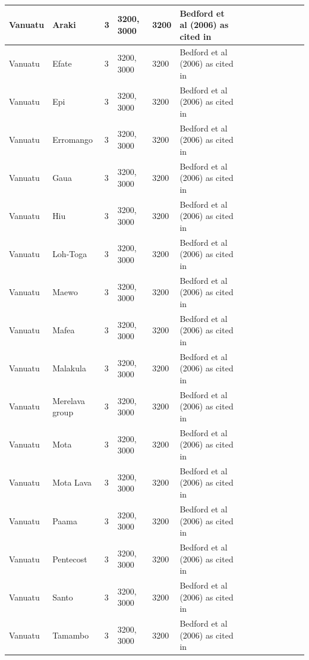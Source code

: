 \documentclass[draft,10pt]{article} %
\begin{document}
\begin{landscape}
\begin{longtable}{| p{3cm}| p{4cm}| p{4cm}|p{2cm}|p{2cm}|p{2cm}|p{2cm}|p{2cm}|p{2cm}|p{2cm}|p{2cm}|p{2cm}|p{2cm}|p{2cm}}
 Vanuatu & Araki & 3 & 3200, 3000 & 3200 & Bedford et al (2006) as cited in \citet{rieth_cochrane_2018} &   \\ \hline
 Vanuatu & Efate & 3 & 3200, 3000 & 3200 & Bedford et al (2006) as cited in \citet{rieth_cochrane_2018} &   \\ \hline
 Vanuatu & Epi & 3 & 3200, 3000 & 3200 & Bedford et al (2006) as cited in \citet{rieth_cochrane_2018} &   \\ \hline
 Vanuatu & Erromango & 3 & 3200, 3000 & 3200 & Bedford et al (2006) as cited in \citet{rieth_cochrane_2018} &   \\ \hline
 Vanuatu & Gaua & 3 & 3200, 3000 & 3200 & Bedford et al (2006) as cited in \citet{rieth_cochrane_2018} &   \\ \hline
 Vanuatu & Hiu & 3 & 3200, 3000 & 3200 & Bedford et al (2006) as cited in \citet{rieth_cochrane_2018} &   \\ \hline
 Vanuatu & Loh-Toga & 3 & 3200, 3000 & 3200 & Bedford et al (2006) as cited in \citet{rieth_cochrane_2018} &   \\ \hline
 Vanuatu & Maewo & 3 & 3200, 3000 & 3200 & Bedford et al (2006) as cited in \citet{rieth_cochrane_2018} &   \\ \hline
 Vanuatu & Mafea & 3 & 3200, 3000 & 3200 & Bedford et al (2006) as cited in \citet{rieth_cochrane_2018} &   \\ \hline
 Vanuatu & Malakula & 3 & 3200, 3000 & 3200 & Bedford et al (2006) as cited in \citet{rieth_cochrane_2018} &   \\ \hline
 Vanuatu & Merelava group & 3 & 3200, 3000 & 3200 & Bedford et al (2006) as cited in \citet{rieth_cochrane_2018} &   \\ \hline
 Vanuatu & Mota & 3 & 3200, 3000 & 3200 & Bedford et al (2006) as cited in \citet{rieth_cochrane_2018} &   \\ \hline
 Vanuatu & Mota Lava & 3 & 3200, 3000 & 3200 & Bedford et al (2006) as cited in \citet{rieth_cochrane_2018} &   \\ \hline
 Vanuatu & Paama & 3 & 3200, 3000 & 3200 & Bedford et al (2006) as cited in \citet{rieth_cochrane_2018} &   \\ \hline
 Vanuatu & Pentecost & 3 & 3200, 3000 & 3200 & Bedford et al (2006) as cited in \citet{rieth_cochrane_2018} &   \\ \hline
 Vanuatu & Santo & 3 & 3200, 3000 & 3200 & Bedford et al (2006) as cited in \citet{rieth_cochrane_2018} &   \\ \hline
 Vanuatu & Tamambo & 3 & 3200, 3000 & 3200 & Bedford et al (2006) as cited in \citet{rieth_cochrane_2018} &   \\ \hline

\end{longtable}
\end{landscape}
\end{document}
